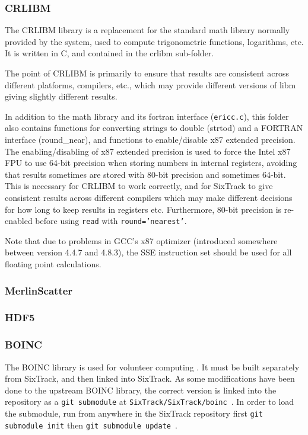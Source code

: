 \documentclass[english]{article}
\begin{document}
\subsubsection{CRLIBM}
\label{sec:building:libs:crlibm}
The CRLIBM library  is a replacement for the standard math library normally provided by the system, used to compute trigonometric functions, logarithms, etc.
It is written in C, and contained in the \textrm{crlibm} sub-folder.

The point of CRLIBM is primarily to ensure that results are consistent across different platforms, compilers, etc., which may provide different versions of libm giving slightly different results.

In addition to the math library and its fortran interface (\texttt{ericc.c}), this folder also contains functions for converting strings to double (\textrm{strtod}) and a FORTRAN interface (\textrm{round\_near}), and functions to enable/disable x87 extended precision.
The enabling/disabling of x87 extended precision is used to force the Intel x87 FPU to use 64-bit precision when storing numbers in internal registers, avoiding that results sometimes are stored with 80-bit precision and sometimes 64-bit.
This is necessary for CRLIBM to work correctly, and for SixTrack to give consistent results across different compilers which may make different decisions for how long to keep results in registers etc.
Furthermore, 80-bit precision is re-enabled before using \texttt{read} with \texttt{round='nearest'}.

Note that due to problems in GCC's x87 optimizer (introduced somewhere between version 4.4.7 and 4.8.3), the SSE instruction set should be used for all floating point calculations.

\subsubsection{MerlinScatter}

\subsubsection{HDF5}

\subsubsection{BOINC}
\label{sec:building:libs:BOINC}
The BOINC library is used for volunteer computing .
It must be built separately from SixTrack, and then linked into SixTrack.
As some modifications have been done to the upstream BOINC library, the correct version is linked into the repository as a \texttt{git submodule}  at \texttt{SixTrack/SixTrack/boinc}~.
In order to load the submodule, run from anywhere in the SixTrack repository first \texttt{git submodule init} then \texttt{git submodule update}~.
\end{document}
